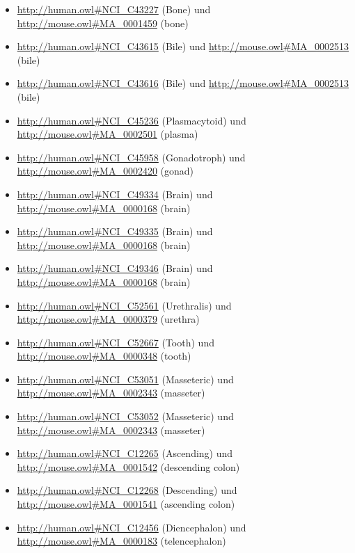 \begin{itemize}
\item \url{http://human.owl#NCI_C43227} (Bone\textunderscoreMarrow\textunderscoreStem\textunderscoreCell\textunderscoreCommitted\textunderscoreto\textunderscorethe\textunderscoreBasophil\textunderscoreLineage) und \url{http://mouse.owl#MA_0001459} (bone)
\item \url{http://human.owl#NCI_C43615} (Bile\textunderscoreDuct\textunderscoreTissue) und \url{http://mouse.owl#MA_0002513} (bile)
\item \url{http://human.owl#NCI_C43616} (Bile\textunderscoreDuct\textunderscoreEpithelium) und \url{http://mouse.owl#MA_0002513} (bile)
\item \url{http://human.owl#NCI_C45236} (Plasmacytoid\textunderscoreDendritic\textunderscoreCell\textunderscorePrecursor) und \url{http://mouse.owl#MA_0002501} (plasma)
\item \url{http://human.owl#NCI_C45958} (Gonadotroph\textunderscoreCell) und \url{http://mouse.owl#MA_0002420} (gonad)
\item \url{http://human.owl#NCI_C49334} (Brain\textunderscoreWhite\textunderscoreMatter) und \url{http://mouse.owl#MA_0000168} (brain)
\item \url{http://human.owl#NCI_C49335} (Brain\textunderscorePia\textunderscoreMater) und \url{http://mouse.owl#MA_0000168} (brain)
\item \url{http://human.owl#NCI_C49346} (Brain\textunderscoreNucleus) und \url{http://mouse.owl#MA_0000168} (brain)
\item \url{http://human.owl#NCI_C52561} (Urethralis) und \url{http://mouse.owl#MA_0000379} (urethra)
\item \url{http://human.owl#NCI_C52667} (Tooth) und \url{http://mouse.owl#MA_0000348} (tooth)
\item \url{http://human.owl#NCI_C53051} (Masseteric\textunderscoreVein) und \url{http://mouse.owl#MA_0002343} (masseter)
\item \url{http://human.owl#NCI_C53052} (Masseteric\textunderscoreArtery) und \url{http://mouse.owl#MA_0002343} (masseter)
\item \url{http://human.owl#NCI_C12265} (Ascending\textunderscoreColon) und \url{http://mouse.owl#MA_0001542} (descending colon)
\item \url{http://human.owl#NCI_C12268} (Descending\textunderscoreColon) und \url{http://mouse.owl#MA_0001541} (ascending colon)
\item \url{http://human.owl#NCI_C12456} (Diencephalon) und \url{http://mouse.owl#MA_0000183} (telencephalon)

\end{itemize}
